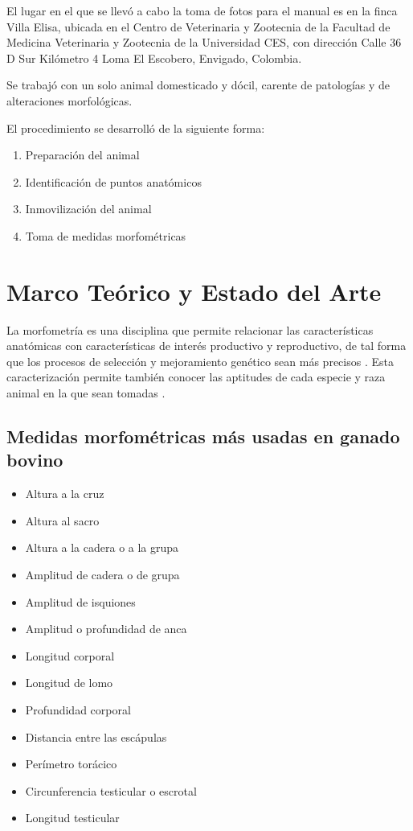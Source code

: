 \documentclass[
]{book}
\providecommand{\tightlist}{%
  \setlength{\itemsep}{0pt}\setlength{\parskip}{0pt}}
\begin{document}
El lugar en el que se llevó a cabo la toma de fotos para el manual es en la finca Villa Elisa, ubicada en el Centro de Veterinaria y Zootecnia de la Facultad de Medicina Veterinaria y Zootecnia de la Universidad CES, con dirección Calle 36 D Sur Kilómetro 4 Loma El Escobero, Envigado, Colombia.

Se trabajó con un solo animal domesticado y dócil, carente de patologías y de alteraciones morfológicas.

El procedimiento se desarrolló de la siguiente forma:

\begin{enumerate}
\def\labelenumi{\arabic{enumi}.}
\tightlist
\item
  Preparación del animal
\item
  Identificación de puntos anatómicos
\item
  Inmovilización del animal
\item
  Toma de medidas morfométricas
\end{enumerate}

\chapter{Marco Teórico y Estado del Arte}\label{marco-teuxf3rico-y-estado-del-arte}

La morfometría es una disciplina que permite relacionar las características anatómicas con características de interés productivo y reproductivo, de tal forma que los procesos de selección y mejoramiento genético sean más precisos \citep{Medina2005}. Esta caracterización permite también conocer las aptitudes de cada especie y raza animal en la que sean tomadas \citep{Gonzalez2021}.

\section{Medidas morfométricas más usadas en ganado bovino}\label{medidas-morfomuxe9tricas-muxe1s-usadas-en-ganado-bovino}

\begin{itemize}
\tightlist
\item
  Altura a la cruz
\item
  Altura al sacro
\item
  Altura a la cadera o a la grupa
\item
  Amplitud de cadera o de grupa
\item
  Amplitud de isquiones
\item
  Amplitud o profundidad de anca
\item
  Longitud corporal
\item
  Longitud de lomo
\item
  Profundidad corporal
\item
  Distancia entre las escápulas
\item
  Perímetro torácico
\item
  Circunferencia testicular o escrotal
\item
  Longitud testicular
\end{itemize}
\end{document}
